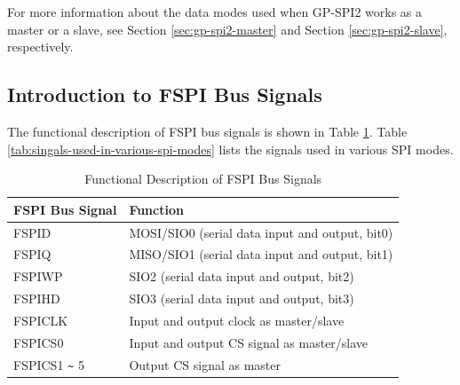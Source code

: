 \documentclass[main\_\_EN.tex]{subfiles}
\begin{document}
For more information about the data modes used when GP-SPI2 works as a master or a slave, see Section \ref{sec:gp-spi2-master} and Section \ref{sec:gp-spi2-slave}, respectively. 

\subsection{Introduction to FSPI Bus Signals}
The functional description of FSPI bus signals is shown in Table \ref{table:SPI_signals}. Table \ref{tab:singals-used-in-various-spi-modes} lists the signals used in various SPI modes. 


\begin{ThreePartTable}

\begin{TableNotes}
\end{TableNotes}

\begin{longtable}[c]{|l|l|}    
\caption{Functional Description of FSPI Bus Signals}  
\label{table:SPI_signals}\\   
\hline     
    \rowcolor{lightgray} 
    \textbf{FSPI Bus Signal}& \textbf{Function} \\
    \hline 
    \endfirsthead
    \endlastfoot
    FSPID & MOSI/SIO0 (serial data input and output, bit0)\\
    \hline
    FSPIQ & MISO/SIO1 (serial data input and output, bit1) \\\hline
    FSPIWP & SIO2 (serial data input and output, bit2) \\\hline
    FSPIHD & SIO3 (serial data input and output, bit3) \\\hline
    FSPICLK & Input and output clock as master/slave \\\hline
    FSPICS0 & Input and output CS signal as master/slave \\\hline
    FSPICS1 \verb+~+ 5 & Output CS signal as master\\\hline
\end{longtable}

\end{ThreePartTable}
\end{document}
